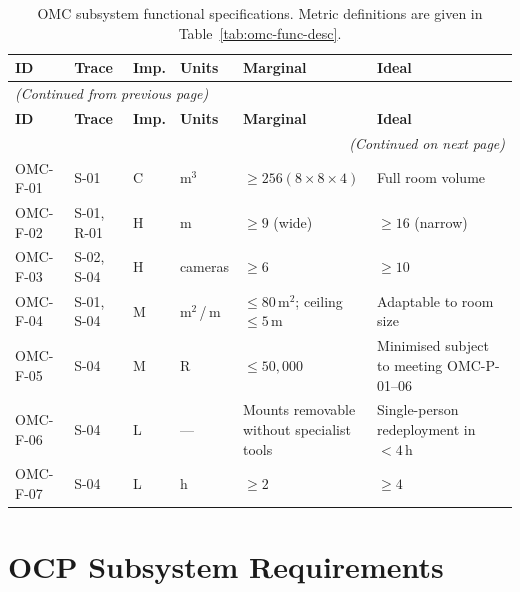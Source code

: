 {\small\setlength{\tabcolsep}{4pt}
\begin{longtable}{p{1.5cm} p{1.8cm} p{0.7cm} p{1.0cm} >{\raggedright\arraybackslash}p{\dimexpr(\linewidth-1.5cm-1.8cm-0.7cm-1.0cm-12\tabcolsep)/2\relax} >{\raggedright\arraybackslash}p{\dimexpr(\linewidth-1.5cm-1.8cm-0.7cm-1.0cm-12\tabcolsep)/2\relax}}
\caption[OMC subsystem functional specifications.]{OMC subsystem functional specifications. Metric definitions are given in Table~\ref{tab:omc-func-desc}.}
\label{tab:omc-func}\\
\toprule
\textbf{ID} & \textbf{Trace} & \textbf{Imp.} & \textbf{Units} & \textbf{Marginal} & \textbf{Ideal} \\
\midrule
\endfirsthead
\multicolumn{6}{l}{\small\textit{(Continued from previous page)}}\\[2pt]
\toprule
\textbf{ID} & \textbf{Trace} & \textbf{Imp.} & \textbf{Units} & \textbf{Marginal} & \textbf{Ideal} \\
\midrule
\endhead
\midrule
\multicolumn{6}{r}{\small\textit{(Continued on next page)}}\\
\endfoot
\bottomrule
\endlastfoot
OMC-F-01 & S-01 & C & m$^3$ & $\geq 256$\newline $(8{\times}8{\times}4)$ & Full room volume \\[4pt]
OMC-F-02 & S-01, R-01 & H & m & $\geq 9$ (wide) & $\geq 16$ (narrow) \\[4pt]
OMC-F-03 & S-02, S-04 & H & cameras & $\geq 6$ & $\geq 10$ \\[4pt]
OMC-F-04 & S-01, S-04 & M & m$^2$\,/\,m & $\leq 80$\,m$^2$; ceiling $\leq 5$\,m & Adaptable to room size \\[4pt]
OMC-F-05 & S-04 & M & R & $\leq 50,000$ & Minimised subject to meeting OMC-P-01--06 \\[4pt]
OMC-F-06 & S-04 & L & --- & Mounts removable without specialist tools & Single-person redeployment in $< 4$\,h \\[4pt]
OMC-F-07 & S-04 & L & h & $\geq 2$ & $\geq 4$ \\
\end{longtable}}

\section{OCP Subsystem Requirements}


